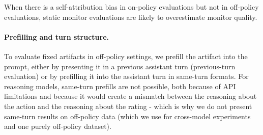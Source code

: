 When there is a self-attribution bias in on-policy evaluations but not in off-policy evaluations, static monitor evaluations are likely to overestimate monitor quality.

\paragraph{Prefilling and turn structure.}
To evaluate fixed artifacts in off-policy settings, we prefill the artifact into the prompt, either by presenting it in a previous assistant turn (previous-turn evaluation) or by prefilling it into the assistant turn in same-turn formats. 
For reasoning models, same-turn prefills are not possible, both because of API limitations and because it would create a mismatch between the reasoning about the action and the reasoning about the rating - which is why we do not present same-turn results on off-policy data (which we use for cross-model experiments and one purely off-policy dataset).


